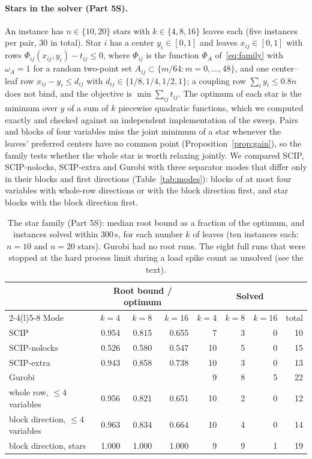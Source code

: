 \paragraph{Stars in the solver (Part 5S).} An instance has $n\in\{10,20\}$
stars with $k\in\{4,8,16\}$ leaves each (five instances per pair, 30 in total).
Star $i$ has a center $y_i\in[0,1]$ and leaves $x_{ij}\in[0,1]$ with rows
$\Phi_{ij}(x_{ij},y_i)-t_{ij}\le0$, where $\Phi_{ij}$ is the function $\Phi_A$
of~\eqref{eq:family} with $\omega_A=1$ for a random two-point set
$A_{ij}\subset\{m/64:m=0,\dots,48\}$, and one center--leaf row
$x_{ij}-y_i\le d_{ij}$ with $d_{ij}\in\{1/8,1/4,1/2,1\}$; a coupling row
$\sum_iy_i\le0.8n$ does not bind, and the objective is $\min\sum_{ij}t_{ij}$.
The optimum of each star is the minimum over $y$ of a sum of $k$ piecewise
quadratic functions, which we computed exactly and checked against an
independent implementation of the sweep. Pairs and blocks of four variables
miss the joint minimum of a star whenever the leaves' preferred centers have no
common point (Proposition~\ref{prop:gain}), so the family tests whether the
whole star is worth relaxing jointly. We compared SCIP, SCIP-nolocks,
SCIP-extra and Gurobi with three separator modes that differ only in their
blocks and first directions (Table~\ref{tab:modes}): blocks of at most four
variables with whole-row directions or with the block direction first, and
star blocks with the block direction first.

\begin{table}[t]
\centering\footnotesize
\caption{The star family (Part 5S): median root bound as a fraction of the
optimum, and instances solved within 300\,s, for each number $k$ of leaves (ten
instances each: $n=10$ and $n=20$ stars). Gurobi had no root runs. The eight full runs that were stopped at the hard
process limit during a load spike count as unsolved (see the text).}\label{tab:stars}
\begin{tabular}{@{}lrrrrrrr@{}}
\toprule
& \multicolumn{3}{c}{Root bound / optimum} & \multicolumn{4}{c}{Solved}\\
\cmidrule(lr){2-4}\cmidrule(l){5-8}
Mode & $k=4$ & $k=8$ & $k=16$ & $k=4$ & $k=8$ & $k=16$ & total\\
\midrule
SCIP & 0.954 & 0.815 & 0.655 & 7 & 3 & 0 & 10\\
SCIP-nolocks & 0.526 & 0.580 & 0.547 & 10 & 5 & 0 & 15\\
SCIP-extra & 0.943 & 0.858 & 0.738 & 10 & 3 & 0 & 13\\
Gurobi & & & & 9 & 8 & 5 & 22\\
whole row, $\le4$ variables & 0.956 & 0.821 & 0.651 & 10 & 2 & 0 & 12\\
block direction, $\le4$ variables & 0.963 & 0.834 & 0.664 & 10 & 4 & 0 & 14\\
block direction, stars & 1.000 & 1.000 & 1.000 & 9 & 9 & 1 & 19\\
\bottomrule
\end{tabular}
\end{table}

